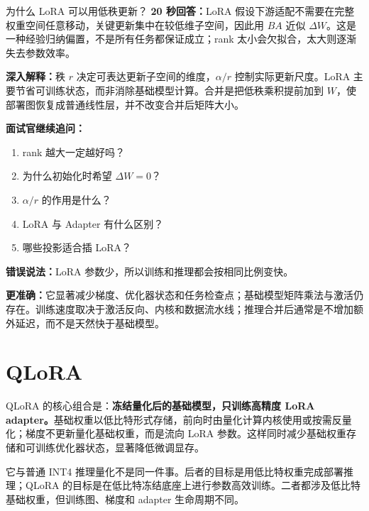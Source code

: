\begin{interviewbox}{为什么 LoRA 可以用低秩更新？}
\textbf{20 秒回答：}LoRA 假设下游适配不需要在完整权重空间任意移动，关键更新集中在较低维子空间，因此用 $BA$ 近似 $\Delta W$。这是一种经验归纳偏置，不是所有任务都保证成立；rank 太小会欠拟合，太大则逐渐失去参数效率。

\textbf{深入解释：}秩 $r$ 决定可表达更新子空间的维度，$\alpha/r$ 控制实际更新尺度。LoRA 主要节省可训练状态，而非消除基础模型计算。合并是把低秩乘积提前加到 $W$，使部署图恢复成普通线性层，并不改变合并后矩阵大小。

\textbf{面试官继续追问：}
\begin{enumerate}
  \item rank 越大一定越好吗？
  \item 为什么初始化时希望 $\Delta W=0$？
  \item $\alpha/r$ 的作用是什么？
  \item LoRA 与 Adapter 有什么区别？
  \item 哪些投影适合插 LoRA？
\end{enumerate}
\end{interviewbox}

\begin{wrongbox}
\textbf{错误说法：}LoRA 参数少，所以训练和推理都会按相同比例变快。

\textbf{更准确：}它显著减少梯度、优化器状态和任务检查点；基础模型矩阵乘法与激活仍存在。训练速度取决于激活反向、内核和数据流水线；推理合并后通常是不增加额外延迟，而不是天然快于基础模型。
\end{wrongbox}

\section{QLoRA}
\label{sec:qlora}

QLoRA 的核心组合是：\textbf{冻结量化后的基础模型，只训练高精度 LoRA adapter。}基础权重以低比特形式存储，前向时由量化计算内核使用或按需反量化；梯度不更新量化基础权重，而是流向 LoRA 参数。这样同时减少基础权重存储和可训练优化器状态，显著降低微调显存。

它与普通 INT4 推理量化不是同一件事。后者的目标是用低比特权重完成部署推理；QLoRA 的目标是在低比特冻结底座上进行参数高效训练。二者都涉及低比特基础权重，但训练图、梯度和 adapter 生命周期不同。

